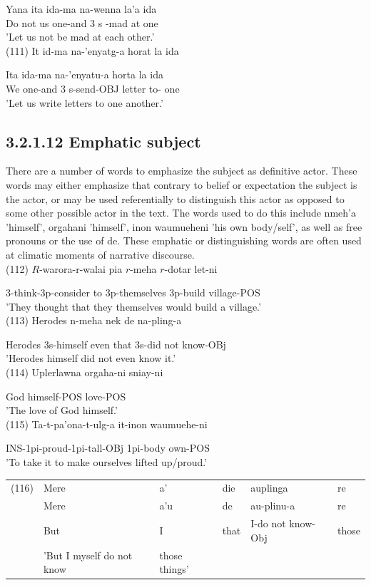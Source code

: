 \documentclass[10pt]{article}
\begin{document}
Yana ita ida-ma na-wenna la'a ida\\
Do not us one-and 3 s -mad at one\\
'Let us not be mad at each other.'\\
(111) It id-ma na-'enyatg-a horat la ida

Ita ida-ma na-'enyatu-a horta la ida\\
We one-and 3 s-send-OBJ letter to- one\\
'Let us write letters to one another.'

\subsection*{3.2.1.12 Emphatic subject}
There are a number of words to emphasize the subject as definitive actor. These words may either emphasize that contrary to belief or expectation the subject is the actor, or may be used referentially to distinguish this actor as opposed to some other possible actor in the text. The words used to do this include nmeh'a 'himself', orgahani 'himself', inon waumueheni 'his own body/self', as well as free pronouns or the use of de. These emphatic or distinguishing words are often used at climatic moments of narrative discourse.\\
(112) \(R\)-warora-r-walai pia \(r\)-meha \(r\)-dotar let-ni

3-think-3p-consider to 3p-themselves 3p-build village-POS\\
'They thought that they themselves would build a village.'\\
(113) Herodes n-meha nek de na-pling-a

Herodes 3s-himself even that 3s-did not know-OBj\\
'Herodes himself did not even know it.'\\
(114) Uplerlawna orgaha-ni sniay-ni

God himself-POS love-POS\\
'The love of God himself.'\\
(115) Ta-t-pa'ona-t-ulg-a it-inon waumuehe-ni

INS-1pi-proud-1pi-tall-OBj 1pi-body own-POS\\
'To take it to make ourselves lifted up/proud.'

\begin{center}
\begin{tabular}{llllll}
(116) & Mere & a' & die & auplinga & re \\
 & Mere & a'u & de & au-plinu-a & re \\
 & But & I & that & I-do not know-Obj & those \\
 & 'But I myself do not know & those things' &  &  &  \\
\end{tabular}
\end{center}
\end{document}
